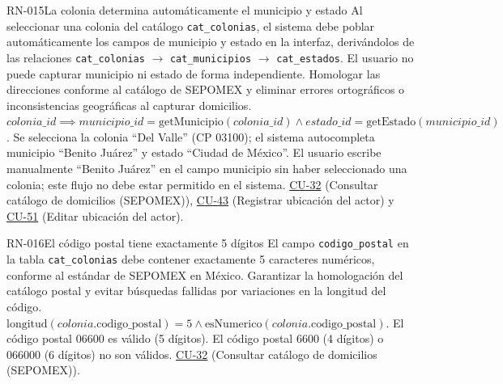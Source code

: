 
\begin{BussinesRule}[%
	\brClassification{\btDerivation}{\bcIntegrity}{\blStrict}%
	]{RN-015}{La colonia determina automáticamente el municipio y estado}
	\BRitem[Descripción:] Al seleccionar una colonia del catálogo \texttt{cat\_colonias}, el sistema debe poblar automáticamente los campos de municipio y estado en la interfaz, derivándolos de las relaciones \texttt{cat\_colonias} $\rightarrow$ \texttt{cat\_municipios} $\rightarrow$ \texttt{cat\_estados}. El usuario no puede capturar municipio ni estado de forma independiente.
	\BRitem[Motivación:] Homologar las direcciones conforme al catálogo de SEPOMEX y eliminar errores ortográficos o inconsistencias geográficas al capturar domicilios.
	\BRitem[Sentencia:] $colonia\_id \implies municipio\_id = \text{getMunicipio}(colonia\_id) \land estado\_id = \text{getEstado}(municipio\_id)$.
	 Se selecciona la colonia ``Del Valle'' (CP 03100); el sistema autocompleta municipio ``Benito Juárez'' y estado ``Ciudad de México''.
	 El usuario escribe manualmente ``Benito Juárez'' en el campo municipio sin haber seleccionado una colonia; este flujo no debe estar permitido en el sistema.
	 \hyperlink{CU-32}{CU-32} (Consultar catálogo de domicilios (SEPOMEX)), \hyperlink{CU-43}{CU-43} (Registrar ubicación del actor) y \hyperlink{CU-51}{CU-51} (Editar ubicación del actor).
\end{BussinesRule}

\begin{BussinesRule}[%
	\brClassification{\btDerivation}{\bcIntegrity}{\blStrict}%
	]{RN-016}{El código postal tiene exactamente 5 dígitos}
	\BRitem[Descripción:] El campo \texttt{codigo\_postal} en la tabla \texttt{cat\_colonias} debe contener exactamente 5 caracteres numéricos, conforme al estándar de SEPOMEX en México.
	\BRitem[Motivación:] Garantizar la homologación del catálogo postal y evitar búsquedas fallidas por variaciones en la longitud del código.
	\BRitem[Sentencia:] $\text{longitud}(colonia.\text{codigo\_postal}) = 5 \land \text{esNumerico}(colonia.\text{codigo\_postal})$.
	 El código postal 06600 es válido (5 dígitos).
	 El código postal 6600 (4 dígitos) o 066000 (6 dígitos) no son válidos.
	 \hyperlink{CU-32}{CU-32} (Consultar catálogo de domicilios (SEPOMEX)).
\end{BussinesRule}

